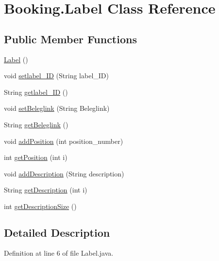 \hypertarget{class_booking_1_1_label}{\section{Booking.\-Label Class Reference}
\label{class_booking_1_1_label}
}
\subsection*{Public Member Functions}
\begin{DoxyCompactItemize}
\item 
\hyperlink{class_booking_1_1_label_aa37e4a1b487852af0cb450d7a578c2d9}{Label} ()
\item 
void \hyperlink{class_booking_1_1_label_a714cff6c53d7ede37910689f94498f70}{setlabel\-\_\-\-I\-D} (String label\-\_\-\-I\-D)
\item 
String \hyperlink{class_booking_1_1_label_a46dcc1ddc8ffc895f6f49b3fbc7bff9a}{getlabel\-\_\-\-I\-D} ()
\item 
void \hyperlink{class_booking_1_1_label_a2bab5fca7c127202fc64417b9cc3a2d1}{set\-Beleglink} (String Beleglink)
\item 
String \hyperlink{class_booking_1_1_label_a05f8d607c2d99cb430d7043525536671}{get\-Beleglink} ()
\item 
void \hyperlink{class_booking_1_1_label_ac49e674df6f0d4567379d6b55bd4b149}{add\-Position} (int position\-\_\-number)
\item 
int \hyperlink{class_booking_1_1_label_a93c786152ce21835d719a6360e2a549a}{get\-Position} (int i)
\item 
void \hyperlink{class_booking_1_1_label_aceebf469651c6e8f2a76e8972b3cb088}{add\-Description} (String description)
\item 
String \hyperlink{class_booking_1_1_label_a3223f20d68a3ac41afa92c39a9bf652a}{get\-Description} (int i)
\item 
int \hyperlink{class_booking_1_1_label_a3462c235882d7fcbf385aa65055f3716}{get\-Description\-Size} ()
\end{DoxyCompactItemize}


\subsection{Detailed Description}


Definition at line 6 of file Label.\-java.



